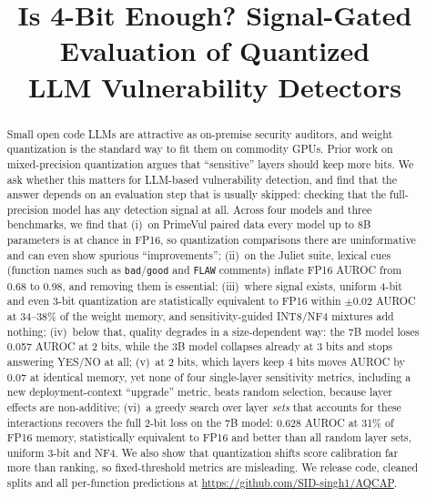 \documentclass[conference]{IEEEtran}
\begin{document}
\title{Is 4-Bit Enough? Signal-Gated Evaluation of Quantized\\LLM Vulnerability Detectors}

\author{
\and
{}
}

\maketitle

\begin{abstract}
Small open code LLMs are attractive as on-premise security auditors, and weight quantization is the standard way to fit them on commodity GPUs. Prior work on mixed-precision quantization argues that ``sensitive'' layers should keep more bits. We ask whether this matters for LLM-based vulnerability detection, and find that the answer depends on an evaluation step that is usually skipped: checking that the full-precision model has any detection signal at all. Across four models and three benchmarks, we find that (i)~on PrimeVul paired data every model up to 8B parameters is at chance in FP16, so quantization comparisons there are uninformative and can even show spurious ``improvements''; (ii)~on the Juliet suite, lexical cues (function names such as \texttt{bad}/\texttt{good} and \texttt{FLAW} comments) inflate FP16 AUROC from 0.68 to 0.98, and removing them is essential; (iii)~where signal exists, uniform 4-bit and even 3-bit quantization are statistically equivalent to FP16 within $\pm$0.02 AUROC at 34--38\% of the weight memory, and sensitivity-guided INT8/NF4 mixtures add nothing; (iv)~below that, quality degrades in a size-dependent way: the 7B model loses 0.057 AUROC at 2 bits, while the 3B model collapses already at 3 bits and stops answering YES/NO at all; (v)~at 2 bits, which layers keep 4 bits moves AUROC by 0.07 at identical memory, yet none of four single-layer sensitivity metrics, including a new deployment-context ``upgrade'' metric, beats random selection, because layer effects are non-additive; (vi)~a greedy search over layer \emph{sets} that accounts for these interactions recovers the full 2-bit loss on the 7B model: 0.628 AUROC at 31\% of FP16 memory, statistically equivalent to FP16 and better than all random layer sets, uniform 3-bit and NF4. We also show that quantization shifts score calibration far more than ranking, so fixed-threshold metrics are misleading. We release code, cleaned splits and all per-function predictions at \url{https://github.com/SID-singh1/AQCAP}.
\end{abstract}
\end{document}
